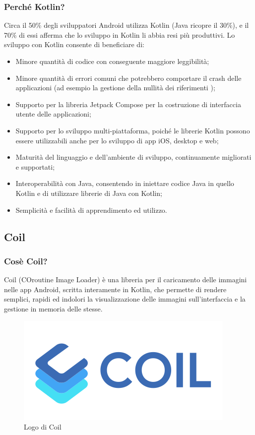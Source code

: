             \subsubsection{Perché Kotlin? \cite{JetBrains1}}
                Circa il 50\% degli sviluppatori Android utilizza Kotlin (Java ricopre il 30\%), e il 70\% di essi afferma che lo sviluppo in Kotlin li abbia resi più produttivi. Lo sviluppo con Kotlin consente di beneficiare di:
                \begin{itemize}
                    \item Minore quantità di codice con conseguente maggiore leggibilità;
                    \item Minore quantità di errori comuni che potrebbero comportare il crash delle applicazioni (ad esempio la gestione della nullità dei riferimenti \cite{JetBrains2});
                    \item Supporto per la libreria Jetpack Compose per la costruzione di interfaccia utente delle applicazioni;
                    \item Supporto per lo sviluppo multi-piattaforma, poiché le librerie Kotlin possono essere utilizzabili anche per lo sviluppo di app iOS, desktop e web;
                    \item Maturità del linguaggio e dell'ambiente di sviluppo, continuamente migliorati e supportati;
                    \item Interoperabilità con Java, consentendo in iniettare codice Java in quello Kotlin e di utilizzare librerie di Java con Kotlin;
                    \item Semplicità e facilità di apprendimento ed utilizzo.
                \end{itemize}
                 
        \subsection{Coil}
            \subsubsection{Cosè Coil?}
                Coil (COroutine Image Loader) è una libreria per il caricamento delle immagini nelle app Android, scritta interamente in Kotlin, che permette di rendere semplici, rapidi ed indolori la visualizzazione delle immagini sull'interfaccia e la gestione in memoria delle stesse.
            \begin{figure}[htbp!]
                \centering
                \includegraphics[width=0.5\linewidth]{Immagini/System Design/Coil.png}
                \caption{Logo di Coil}
            \end{figure}
